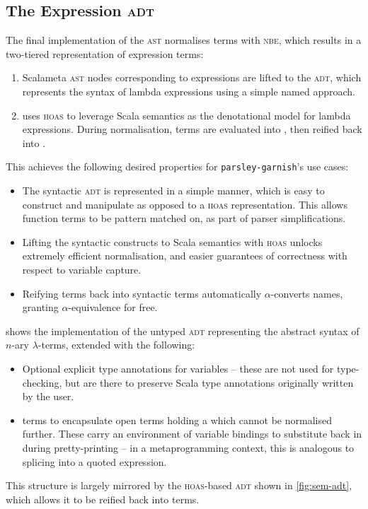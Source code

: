 \documentclass[../../../main.tex]{subfiles}
\begin{document}
\subsection{The Expression \textsc{adt}}
The final implementation of the  \textsc{ast} normalises terms with \textsc{nbe}, which results in a two-tiered representation of expression terms:
\begin{enumerate}
  \item Scalameta \textsc{ast} nodes corresponding to expressions are lifted to the  \textsc{adt}, which represents the syntax of lambda expressions using a simple named approach.
  \item {} uses \textsc{hoas} to leverage Scala semantics as the denotational model for lambda expressions. During normalisation,  terms are evaluated into , then reified back into .
\end{enumerate}
%
This achieves the following desired properties for \texttt{parsley-garnish}'s use cases:
\begin{itemize}
  \item The syntactic  \textsc{adt} is represented in a simple manner, which is easy to construct and manipulate as opposed to a \textsc{hoas} representation. This allows function terms to be pattern matched on, as part of parser simplifications.
  \item Lifting the syntactic constructs to Scala semantics with \textsc{hoas} unlocks extremely efficient normalisation, and easier guarantees of correctness with respect to variable capture.
  \item Reifying  terms back into syntactic  terms automatically $\alpha$-converts names, granting $\alpha$-equivalence for free.
\end{itemize}
%
 shows the implementation of the untyped  \textsc{adt} representing the abstract syntax of $n$-ary $\lambda$-terms, extended with the following:
\begin{itemize}
  \item Optional explicit type annotations for variables -- these are not used for type-checking, but are there to preserve Scala type annotations originally written by the user.
  \item {} terms to encapsulate open terms holding a  which cannot be normalised further. These carry an environment of variable bindings to substitute back in during pretty-printing -- in a metaprogramming context, this is analogous to splicing into a quoted expression.
\end{itemize}
This structure is largely mirrored by the \textsc{hoas}-based  \textsc{adt} shown in \cref{fig:sem-adt}, which allows it to be reified back into  terms.
\end{document}
